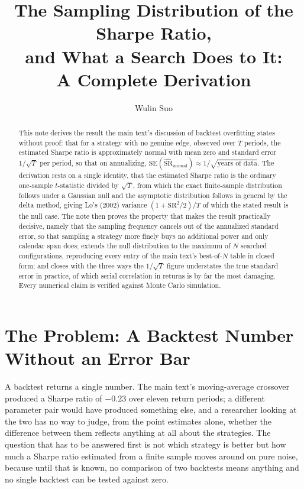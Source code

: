 \documentclass[11pt]{article}
\title{The Sampling Distribution of the Sharpe Ratio,\\ and What a Search Does to It:\\ A Complete Derivation}
\author{Wulin Suo}
\date{}
\theoremstyle{remark}
\theoremstyle{definition}
\newcommand{\SR}{\text{SR}}
\newcommand{\SRhat}{\widehat{\text{SR}}}
\begin{document}
\maketitle

\begin{abstract}
\noindent This note derives the result the main text's discussion of backtest overfitting states without proof: that for a strategy with no genuine edge, observed over $T$ periods, the estimated Sharpe ratio is approximately normal with mean zero and standard error $1/\sqrt{T}$ per period, so that on annualizing, $\text{SE}(\SRhat_{\text{annual}}) \approx 1/\sqrt{\text{years of data}}$. The derivation rests on a single identity, that the estimated Sharpe ratio is the ordinary one-sample $t$-statistic divided by $\sqrt{T}$, from which the exact finite-sample distribution follows under a Gaussian null and the asymptotic distribution follows in general by the delta method, giving Lo's (2002) variance $(1+\SR^2/2)/T$ of which the stated result is the null case. The note then proves the property that makes the result practically decisive, namely that the sampling frequency cancels out of the annualized standard error, so that sampling a strategy more finely buys no additional power and only calendar span does; extends the null distribution to the maximum of $N$ searched configurations, reproducing every entry of the main text's best-of-$N$ table in closed form; and closes with the three ways the $1/\sqrt{T}$ figure understates the true standard error in practice, of which serial correlation in returns is by far the most damaging. Every numerical claim is verified against Monte Carlo simulation.
\end{abstract}

\section{The Problem: A Backtest Number Without an Error Bar}
\label{sec:setup}

A backtest returns a single number. The main text's moving-average crossover produced a Sharpe ratio of $-0.23$ over eleven return periods; a different parameter pair would have produced something else, and a researcher looking at the two has no way to judge, from the point estimates alone, whether the difference between them reflects anything at all about the strategies. The question that has to be answered first is not which strategy is better but how much a Sharpe ratio estimated from a finite sample moves around on pure noise, because until that is known, no comparison of two backtests means anything and no single backtest can be tested against zero.
\end{document}
